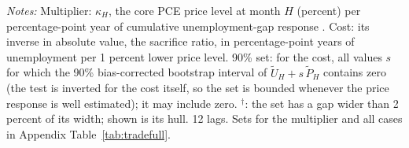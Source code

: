 \begin{table}[tp]\centering\footnotesize\setlength{\tabcolsep}{3pt}
\caption{Implied Trade-Off: The Phillips Multiplier and the Cost of Disinflation}\label{tab:tradeoff}
\begin{flushleft}\footnotesize\textit{Notes:} Multiplier: $\kappa_H$, the core PCE price level at month $H$ (percent) per percentage-point year of cumulative unemployment-gap response \citep{barnichon2021}. Cost: its inverse in absolute value, the sacrifice ratio, in percentage-point years of unemployment per 1 percent lower price level. 90\% set: for the cost, all values $s$ for which the 90\% bias-corrected bootstrap interval of $\tilde U_H+s\,\tilde P_H$ contains zero (the test is inverted for the cost itself, so the set is bounded whenever the price response is well estimated); it may include zero. $^{\dagger}$: the set has a gap wider than 2 percent of its width; shown is its hull. 12 lags. Sets for the multiplier and all cases in Appendix Table~\ref{tab:tradefull}.\end{flushleft}
\end{table}
